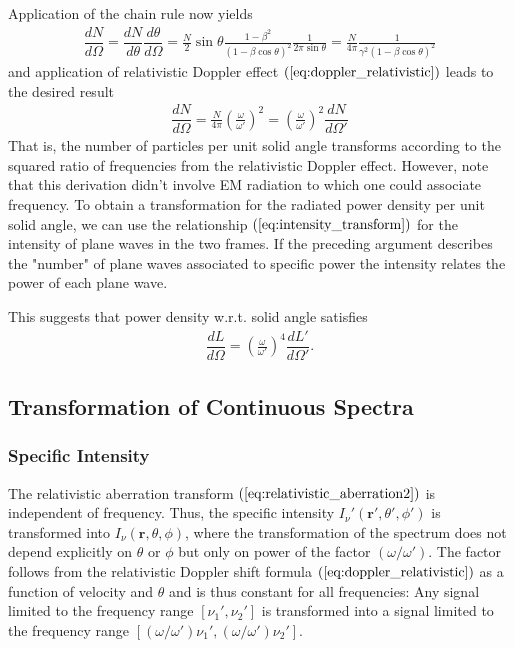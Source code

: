 \documentclass [12pt, a4paper] {article}
\newcommand{\vc}[1]
{
	\boldsymbol{#1}
}
\newcommand{\diff}[2]
{
	\dfrac{d #1}{d #2}
}
\begin{document}
Application of the chain rule now yields 
\begin {eqnarray}
    \diff{N}{\Omega}
    =
    \diff{N}{\theta}\diff{\theta}{\Omega}
    =
    \frac{N}{2}\sin\theta\frac{1-\beta^2}{(1-\beta\cos\theta)^2}
    \frac{1}{2\pi\sin\theta}
    = 
    \frac{N}{4\pi}\frac{1}{\gamma^2(1 - \beta\cos\theta)^2}
\end {eqnarray}
and application of relativistic Doppler effect $(\ref{eq:doppler_relativistic})$
leads to the desired result
\begin {eqnarray}
    \boxed{
        \quad
        \diff{N}{\Omega}
        = 
        \frac{N}{4\pi}
        \left(\frac{\omega}{\omega'}\right)^2
        =
        \left(\frac{\omega}{\omega'}\right)^2
        \diff{N}{\Omega'}
        \quad
    }
\end {eqnarray}
That is, the number of particles per unit solid angle transforms according to the 
squared ratio of frequencies from the relativistic Doppler effect. However, note 
that this derivation didn't involve EM radiation to which one could associate 
frequency. To obtain a transformation for the radiated power density per unit solid 
angle, we can use the relationship $(\ref{eq:intensity_transform})$ for the intensity 
of plane waves in the two frames. If the preceding argument describes the "number" 
of plane waves associated to specific power the intensity relates the power of 
each plane wave. 

This suggests that power density w.r.t. solid angle satisfies 
\begin {eqnarray}
    \label{eq:power_density_mono_transform}
    \boxed{
        \quad
        \diff{L}{\Omega} = \left(
            \frac{\omega}{\omega'}
        \right)^4 
        \diff{L'}{\Omega'}.
        \quad
    }
\end {eqnarray}

\subsection{Transformation of Continuous Spectra}


\subsubsection{Specific Intensity}
The relativistic aberration transform $(\ref{eq:relativistic_aberration2})$ is 
independent of frequency. Thus, the specific intensity 
$I_\nu'(\vc r', \theta', \phi')$ is transformed into $I_\nu(\vc r, \theta, \phi)$,
where the transformation of the spectrum does not depend explicitly on $\theta$
or $\phi$ but only on power of the factor $(\omega/\omega')$. The factor follows 
from the relativistic Doppler shift formula $(\ref{eq:doppler_relativistic})$ as a 
function of velocity and $\theta$ and is thus constant for all frequencies: 
Any signal limited to the frequency range $[\nu_1', \nu_2']$ is transformed into 
a signal limited to the frequency range 
$[(\omega/\omega')\nu_1', (\omega/\omega')\nu_2']$.
\end{document}
